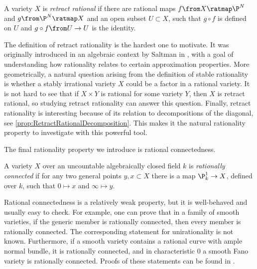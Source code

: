 \begin{definition}
	\label{def:RetractRational}
	A variety $X$ is \emph{retract rational} if there are rational maps $f \from X \ratmap \P^N$ and $g \from \P^N \ratmap X$ and an open subset $U \subset X$, such that $g \circ f$ is defined on $U$ and $g \circ f \from U \to U$ is the identity.
\end{definition}
The definition of retract rationality is the hardest one to motivate. It was originally introduced in an algebraic context by Saltman in \cite{SaltmanHomage}, with a goal of understanding how rationality relates to certain approximation properties. More geometrically, a natural question arising from the definition of stable rationality is whether a stably irrational variety $X$ could be a factor in a rational variety. It is not hard to see that if $X \times Y$ is rational for some variety $Y$, then $X$ is retract rational, so studying retract rationality can answer this question. Finally, retract rationality is interesting because of its relation to decompositions of the diagonal, see \cref{prop:RetractRationalDecomposition}. This makes it the natural rationality property to investigate with this powerful tool.

The final rationality property we introduce is rational connectedness.
\begin{definition}
	\label{def:RationallyConnected}
	A variety $X$ over an uncountable algebraically closed field $k$ is \emph{rationally connected} if for any two general points $y,x \subset X$ there is a map $\P^1_k \to X$, defined over $k$, such that $0 \mapsto x$ and $\infty \mapsto y$.
\end{definition}
Rational connectedness is a relatively weak property, but it is well-behaved and usually easy to check. For example, one can prove that in a family of smooth varieties, if the generic member is rationally connected, then every member is rationally connected. The corresponding statement for \eg unirationality is not known. Furthermore, if a smooth variety contains a rational curve with ample normal bundle, it is rationally connected, and in characteristic 0 a smooth Fano variety is rationally connected. Proofs of these statements can be found in \cite[IV.3, V.2]{KollarRationalCurves}.

